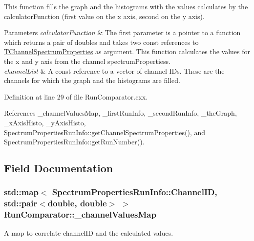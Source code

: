 This function fills the graph and the histograms with the values calculates by the calculator\-Function (first value on the x axis, second on the y axis). 


\begin{DoxyParams}{Parameters}
{\em calculator\-Function} & The first parameter is a pointer to a function which returns a pair of doubles and takes two const references to \hyperlink{class_t_channel_spectrum_properties}{T\-Channel\-Spectrum\-Properties} as argument. This function calculates the values for the x and y axis from the channel spectrum\-Propertiess. \\
\hline
{\em channel\-List} & A const reference to a vector of channel I\-Ds. These are the channels for which the graph and the histograms are filled. \\
\hline
\end{DoxyParams}


Definition at line 29 of file Run\-Comparator.\-cxx.



References \-\_\-channel\-Values\-Map, \-\_\-first\-Run\-Info, \-\_\-second\-Run\-Info, \-\_\-the\-Graph, \-\_\-x\-Axis\-Histo, \-\_\-y\-Axis\-Histo, Spectrum\-Properties\-Run\-Info\-::get\-Channel\-Spectrum\-Properties(), and Spectrum\-Properties\-Run\-Info\-::get\-Run\-Number().



\subsection{Field Documentation}
\hypertarget{class_run_comparator_aae7b9f0694da7b251fdc513c5cf466b7}{
\subsubsection[{\-\_\-channel\-Values\-Map}]{\setlength{\rightskip}{0pt plus 5cm}std\-::map$<$ {\bf Spectrum\-Properties\-Run\-Info\-::\-Channel\-I\-D}, std\-::pair$<$double, double$>$ $>$ Run\-Comparator\-::\-\_\-channel\-Values\-Map\hspace{0.3cm}{\ttfamily [protected]}}}\label{class_run_comparator_aae7b9f0694da7b251fdc513c5cf466b7}


A map to correlate channel\-I\-D and the calculated values. 



